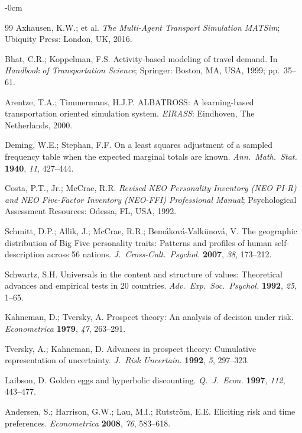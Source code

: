 \documentclass[sustainability,article,submit,pdftex,moreauthors]{Definitions/mdpi}
\begin{document}
\begin{adjustwidth}{-\extralength}{0cm}
\begin{thebibliography}{99}
Axhausen, K.W.; et al.
\textit{The Multi-Agent Transport Simulation MATSim}; Ubiquity Press: London,
UK, 2016.

Bhat, C.R.; Koppelman, F.S. Activity-based modeling of travel demand.
In \textit{Handbook of Transportation Science}; Springer: Boston, MA, USA,
1999; pp.~35--61.

Arentze, T.A.; Timmermans, H.J.P. ALBATROSS: A learning-based transportation
oriented simulation system. \textit{EIRASS}: Eindhoven, The Netherlands, 2000.

Deming, W.E.; Stephan, F.F. On a least squares adjustment of a sampled
frequency table when the expected marginal totals are known.
\textit{Ann.\ Math.\ Stat.} \textbf{1940}, \textit{11}, 427--444.

Costa, P.T., Jr.; McCrae, R.R.
\textit{Revised NEO Personality Inventory (NEO PI-R) and NEO Five-Factor
Inventory (NEO-FFI) Professional Manual}; Psychological Assessment Resources:
Odessa, FL, USA, 1992.

Schmitt, D.P.; Allik, J.; McCrae, R.R.; Bem{\'a}kov{\'a}-Valk{\"u}nov{\'a}, V.
The geographic distribution of Big Five personality traits: Patterns and
profiles of human self-description across 56 nations.
\textit{J.\ Cross-Cult.\ Psychol.} \textbf{2007}, \textit{38}, 173--212.

Schwartz, S.H. Universals in the content and structure of values:
Theoretical advances and empirical tests in 20 countries.
\textit{Adv.\ Exp.\ Soc.\ Psychol.} \textbf{1992}, \textit{25}, 1--65.

Kahneman, D.; Tversky, A. Prospect theory: An analysis of decision under risk.
\textit{Econometrica} \textbf{1979}, \textit{47}, 263--291.

Tversky, A.; Kahneman, D. Advances in prospect theory: Cumulative
representation of uncertainty.
\textit{J.\ Risk Uncertain.} \textbf{1992}, \textit{5}, 297--323.

Laibson, D. Golden eggs and hyperbolic discounting.
\textit{Q.\ J.\ Econ.} \textbf{1997}, \textit{112}, 443--477.

Andersen, S.; Harrison, G.W.; Lau, M.I.; Rutstr{\"o}m, E.E. Eliciting risk
and time preferences.
\textit{Econometrica} \textbf{2008}, \textit{76}, 583--618.


\end{thebibliography}
\end{adjustwidth}
\end{document}
